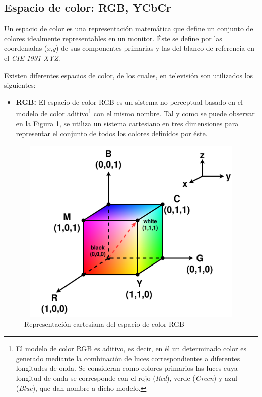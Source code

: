 \documentclass[a4paper, 12pt]{report}
\begin{document}
\subsection{Espacio de color: RGB, YCbCr}
\label{subsec:colorspace}
Un espacio de color es una representación matemática que define un conjunto de colores idealmente representables en un monitor. Éste se define por las coordenadas (\textit{x,y}) de sus componentes primarias y las del blanco de referencia en el \textit{CIE 1931 XYZ}.


Existen diferentes espacios de color, de los cuales, en televisión son utilizados los siguientes:
\begin{itemize}
    \item \textbf{RGB:} El espacio de color RGB es un sistema no perceptual basado en el modelo de color aditivo\footnote{El modelo de color RGB es aditivo, es decir, en él  un determinado color es generado mediante la combinación de luces correspondientes a diferentes longitudes de onda. Se consideran como colores primarios las luces cuya longitud de onda se corresponde con el rojo (\textit{Red}), verde (\textit{Green}) y azul (\textit{Blue}), que dan nombre  a dicho modelo.} con el mismo nombre. Tal y como se puede observar en la Figura \ref{fig:rgbcube}, se utiliza un sistema cartesiano en tres dimensiones para representar el conjunto de todos los colores definidos por éste.
\end{itemize}
\begin{figure}[H]
    \centering
    \includegraphics[width=14cm, height=9cm]{img/3_Fundamentos_de_Television/3_1_Formatos_de_TV_Tradicionales/3_1_2_Espacios_de_Color/1_rgb_cube.png}
    \caption{Representación cartesiana del espacio de color RGB}
    \label{fig:rgbcube}
\end{figure}
\end{document}
